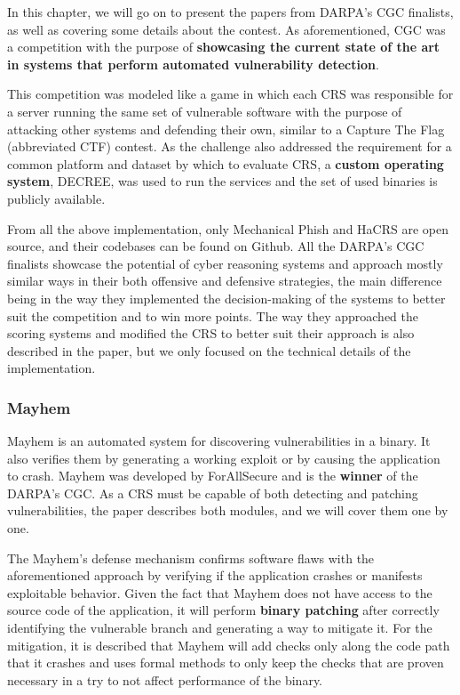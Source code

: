 \documentclass[12pt,a4paper,english,onecolumn]{IEEEtran}
\begin{document}
In this chapter, we will go on to present the papers from DARPA's CGC finalists, as well as covering some details about the contest. As aforementioned, CGC was a competition with the purpose of \textbf{showcasing the current state of the art in systems that perform automated vulnerability detection}.

This competition was modeled like a game in which each CRS was responsible for a server running the same set of vulnerable software with the purpose of attacking other systems and defending their own, similar to a Capture The Flag (abbreviated CTF) contest. As the challenge also addressed the requirement for a common platform and dataset by which to evaluate CRS, a \textbf{custom operating system}, DECREE, was used to run the services and the set of used binaries is publicly available.

From all the above implementation, only Mechanical Phish and HaCRS are open source, and their codebases can be found on Github. All the DARPA's CGC finalists showcase the potential of cyber reasoning systems and approach mostly similar ways in their both offensive and defensive strategies, the main difference being in the way they implemented the decision-making of the systems to better suit the competition and to win more points. The way they approached the scoring systems and modified the CRS to better suit their approach is also described in the paper, but we only focused on the technical details of the implementation.

\subsubsection{Mayhem}

Mayhem \cite{mayhem} is an automated system for discovering vulnerabilities in a binary. It also verifies them by generating a working exploit or by causing the application to crash. Mayhem was developed by ForAllSecure \cite{mayhem_code} and is the \textbf{winner} of the DARPA's CGC. As a CRS must be capable of both detecting and patching vulnerabilities, the paper describes both modules, and we will cover them one by one. 

The Mayhem's defense mechanism confirms software flaws with the aforementioned approach by verifying if the application crashes or manifests exploitable behavior. Given the fact that Mayhem does not have access to the source code of the application, it will perform \textbf{binary patching} after correctly identifying the vulnerable branch and generating a way to mitigate it. For the mitigation, it is described that Mayhem will add checks only along the code path that it crashes and uses formal methods to only keep the checks that are proven necessary in a try to not affect performance of the binary.
\end{document}
